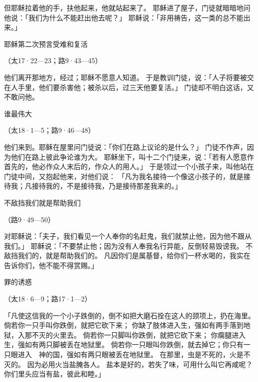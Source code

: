 {但耶稣拉着他的手，扶他起来，他就站起来了。
耶稣进了屋子，门徒就暗暗地问他说：「我们为什么不能赶出他去呢？」
耶稣说：「非用祷告，这一类的{}总不能出来。」
\par }{\SH 耶稣第二次预言受难和复活
\par }{\R （太17·22—23；路9·43—45）
\par }{\PP {}他们离开那地方，经过{}；耶稣不愿意人知道。
于是教训门徒，说：「人子将要被交在人手里，他们要杀害他；被杀以后，过三天他要复活。」
门徒却不明白这话，又不敢问他。
\par }{\SH 谁最伟大
\par }{\R （太18·1—5；路9·46—48）
\par }{\PP {}他们来到{}。耶稣在屋里问门徒说：「你们在路上议论的是什么？」
门徒不作声，因为他们在路上彼此争论谁为大。
耶稣坐下，叫十二个门徒来，说：「若有人愿意作首先的，他必作众人末后的，作众人的用人。」
于是领过一个小孩子来，叫他站在门徒中间，又抱起他来，对他们说：
「凡为我名接待一个像这小孩子的，就是接待我；凡接待我的，不是接待我，乃是接待那差我来的。」
\par }{\SH 不敌挡我们就是帮助我们
\par }{\R （路9·49—50）
\par }{\PP {}对耶稣说：「夫子，我们看见一个人奉你的名赶鬼，我们就禁止他，因为他不跟从我们。」
耶稣说：「不要禁止他；因为没有人奉我名行异能，反倒轻易毁谤我。
不敌挡我们的，就是帮助我们的。
凡因你们是属基督，给你们一杯水喝的，我实在告诉你们，他不能不得赏赐。」
\par }{\SH 罪的诱惑
\par }{\R （太18·6—9；路17·1—2）
\par }{\PP {}「凡使这信我的一个小子跌倒的，倒不如把大磨石拴在这人的颈项上，扔在海里。
倘若你一只手叫你跌倒，就把它砍下来；
你缺了肢体进入{}生，强如有两{}手落到地狱，入那不灭的火里去。
倘若你一只脚叫你跌倒，就把它砍下来；
你瘸腿进入{}生，强如有两只脚被丢在地狱里。
倘若你一只眼叫你跌倒，就去掉它；你只有一只眼进入　神的国，强如有两只眼被丢在地狱里。
在那里，虫是不死的，火是不灭的。
因为必用火当盐腌各人。
盐本是好的，若失了味，可用什么叫它再咸呢？你们里头应当有盐，彼此和睦。」

}
